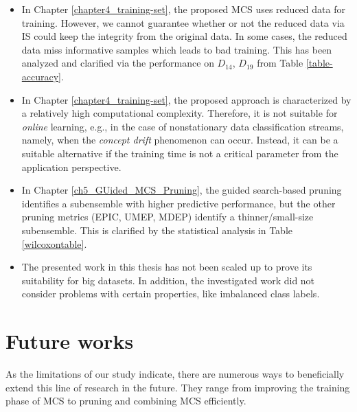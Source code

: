 \begin{itemize}
    \item In Chapter \ref{chapter4_training-set}, the proposed MCS uses reduced data for training. However, we cannot guarantee whether or not the reduced data via IS could keep the integrity from the original data. In some cases, the reduced data miss informative samples which leads to bad training. This has been analyzed and clarified via the performance on $D_{14}$, $D_{19}$ from Table \ref{table-accuracy}.
    \item In Chapter \ref{chapter4_training-set}, the proposed approach is characterized by a relatively high computational complexity. Therefore, it is not suitable for \emph{online} learning, e.g., in the case of nonstationary data classification streams, namely, when the \emph{concept drift} phenomenon can occur. Instead, it can be a suitable alternative if the training time is not a critical parameter from the application perspective.
    
    \item In Chapter \ref{ch5_GUided_MCS_Pruning}, the guided search-based pruning identifies a subensemble with higher predictive performance, but the other pruning metrics (EPIC, UMEP, MDEP) identify a thinner/small-size subensemble. This is clarified by the statistical analysis in Table \ref{wilcoxontable}. 
    
    \item The presented work in this thesis has not been scaled up to prove its suitability for big datasets. In addition, the investigated work did not consider problems with certain properties, like imbalanced class labels.  

\end{itemize}


\section{Future works}\label{ch7:futurework}
As the limitations of our study indicate, there are numerous ways to beneficially extend this line of research in the future. They range from improving the training phase of MCS to pruning and combining MCS efficiently.  


